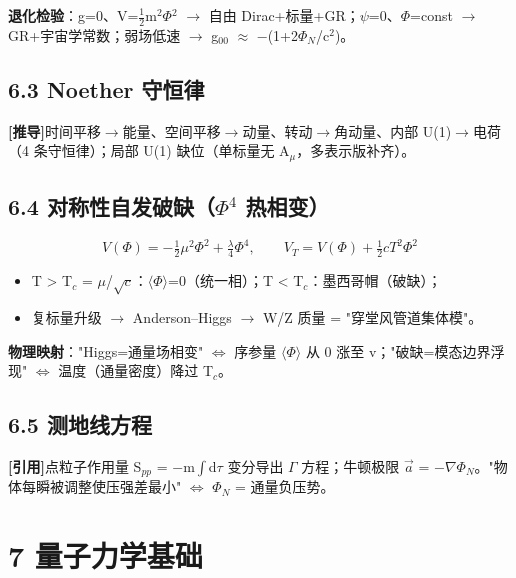 \documentclass[12pt]{article}
\newcommand{\mtag}[1]{\textbf{[#1]}}
\newcommand{\up}[1]{\ensuremath{^{#1}}}
\newcommand{\down}[1]{\ensuremath{_{#1}}}
\begin{document}
\textbf{退化检验}：g=0、V=\ensuremath{\tfrac12}m\up{2}\ensuremath{\Phi}\up{2} \ensuremath{\to} 自由 Dirac+标量+GR；\ensuremath{\psi}=0、\ensuremath{\Phi}=const \ensuremath{\to} GR+宇宙学常数；弱场低速 \ensuremath{\to} g\down{00} \ensuremath{\approx} \ensuremath{-}(1+2\ensuremath{\Phi}\down{N}/c\up{2})。

\subsection{6.3 Noether 守恒律}

\mtag{推导}时间平移\ensuremath{\to}能量、空间平移\ensuremath{\to}动量、转动\ensuremath{\to}角动量、内部 U(1)\ensuremath{\to}电荷（4 条守恒律）；局部 U(1) 缺位（单标量无 A\down{\mu{}}，多表示版补齐）。

\subsection{6.4 对称性自发破缺（\ensuremath{\Phi}\up{4} 热相变）}

\[V(\Phi) = -\tfrac12\mu^2\Phi^2 + \tfrac{\lambda}{4}\Phi^4,\qquad V_T = V(\Phi) + \tfrac12 cT^2\Phi^2\]

\begin{itemize}
\item T > T\down{c} = \ensuremath{\mu}/\ensuremath{\sqrt{c}}：\ensuremath{\langle}\ensuremath{\Phi}\ensuremath{\rangle}=0（统一相）；T < T\down{c}：墨西哥帽（破缺）；
\item 复标量升级 \ensuremath{\to} Anderson--Higgs \ensuremath{\to} W/Z 质量 = "穿堂风管道集体模"。
\end{itemize}

\textbf{物理映射}："Higgs=通量场相变" \ensuremath{\iff} 序参量 \ensuremath{\langle}\ensuremath{\Phi}\ensuremath{\rangle} 从 0 涨至 v；"破缺=模态边界浮现" \ensuremath{\iff} 温度（通量密度）降过 T\down{c}。

\subsection{6.5 测地线方程}

\mtag{引用}点粒子作用量 S\down{pp} = \ensuremath{-}m\ensuremath{\int}d\ensuremath{\tau} 变分导出 \ensuremath{\Gamma} 方程；牛顿极限 \ensuremath{\vec{a}} = \ensuremath{-}\ensuremath{\nabla}\ensuremath{\Phi}\down{N}。"物体每瞬被调整使压强差最小" \ensuremath{\iff} \ensuremath{\Phi}\down{N} = 通量负压势。



\section{7 量子力学基础}
\end{document}
